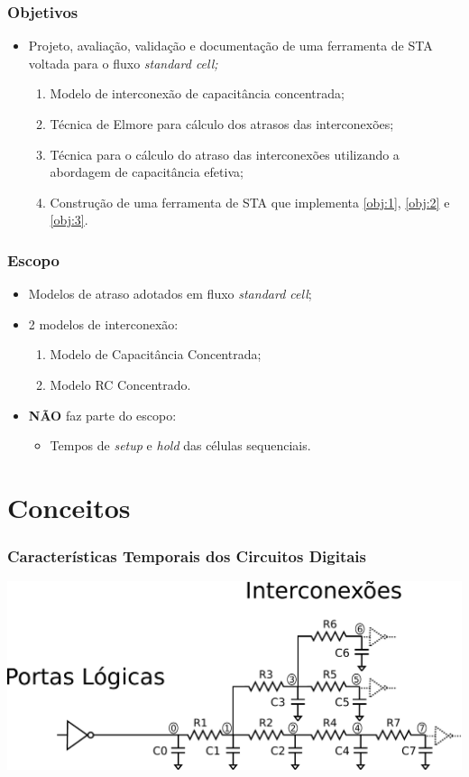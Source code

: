 \documentclass[10pt,a4paper]{beamer}
\begin{document}
			\begin{frame}[t]
				\frametitle{Objetivos}
				\begin{itemize}
					\item Projeto, avaliação, validação e documentação de uma ferramenta de STA voltada para o fluxo \textit{standard cell;}
					\begin{enumerate}
						\item Modelo de interconexão de capacitância concentrada; \label{obj:1}
						\item Técnica de Elmore para cálculo dos atrasos das interconexões; \label{obj:2}
						\item Técnica para o cálculo do atraso das interconexões utilizando a abordagem de capacitância efetiva; \label{obj:3}
						\item Construção de uma ferramenta de STA que implementa \ref{obj:1}, \ref{obj:2} e \ref{obj:3}. 
					\end{enumerate}
				\end{itemize}
			\end{frame}
			
			\begin{frame}[t]
				\frametitle{Escopo}
				\begin{itemize}
					\item Modelos de atraso adotados em fluxo \textit{standard cell};
					\item 2 modelos de interconexão:
						\begin{enumerate}
							\item Modelo de Capacitância Concentrada;
							\item Modelo RC Concentrado.
						\end{enumerate}
					\item \textbf{NÃO} faz parte do escopo:
					\begin{itemize}
						\item Tempos de \textit{setup} e \textit{hold} das células sequenciais.
					\end{itemize}
				\end{itemize}
				
				
			\end{frame}
		
	
	\section{Conceitos}
		
		\begin{frame}
		\frametitle{Características Temporais dos Circuitos Digitais}
			\includegraphics[width=\textwidth]{img/circuito.pdf} 
		\end{frame}
\end{document}
